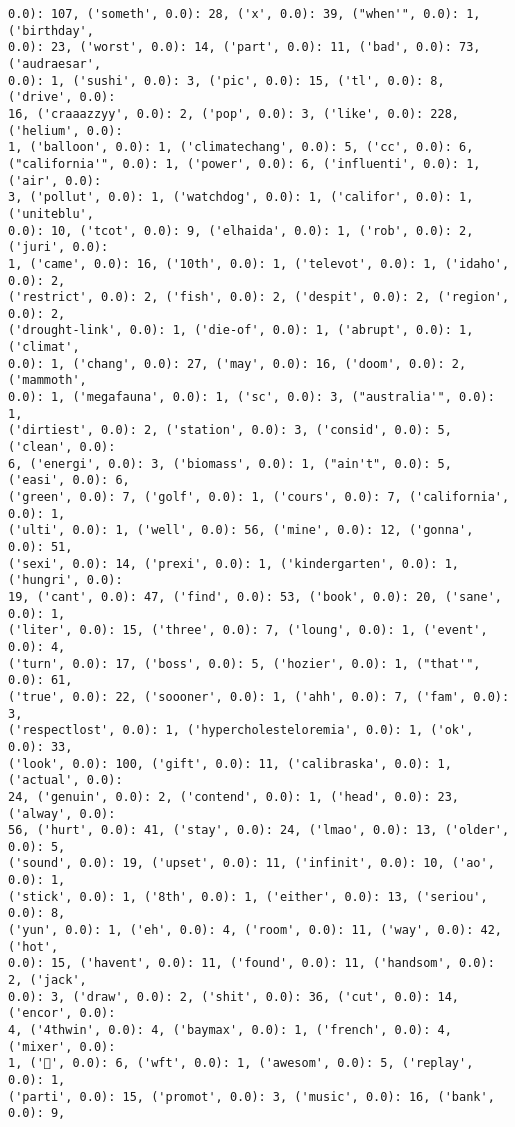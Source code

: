 \documentclass[11pt]{article}
\begin{document}
\begin{Verbatim}[commandchars=\\\{\}]
0.0): 107, ('someth', 0.0): 28, ('x', 0.0): 39, ("when'", 0.0): 1, ('birthday',
0.0): 23, ('worst', 0.0): 14, ('part', 0.0): 11, ('bad', 0.0): 73, ('audraesar',
0.0): 1, ('sushi', 0.0): 3, ('pic', 0.0): 15, ('tl', 0.0): 8, ('drive', 0.0):
16, ('craaazzyy', 0.0): 2, ('pop', 0.0): 3, ('like', 0.0): 228, ('helium', 0.0):
1, ('balloon', 0.0): 1, ('climatechang', 0.0): 5, ('cc', 0.0): 6,
("california'", 0.0): 1, ('power', 0.0): 6, ('influenti', 0.0): 1, ('air', 0.0):
3, ('pollut', 0.0): 1, ('watchdog', 0.0): 1, ('califor', 0.0): 1, ('uniteblu',
0.0): 10, ('tcot', 0.0): 9, ('elhaida', 0.0): 1, ('rob', 0.0): 2, ('juri', 0.0):
1, ('came', 0.0): 16, ('10th', 0.0): 1, ('televot', 0.0): 1, ('idaho', 0.0): 2,
('restrict', 0.0): 2, ('fish', 0.0): 2, ('despit', 0.0): 2, ('region', 0.0): 2,
('drought-link', 0.0): 1, ('die-of', 0.0): 1, ('abrupt', 0.0): 1, ('climat',
0.0): 1, ('chang', 0.0): 27, ('may', 0.0): 16, ('doom', 0.0): 2, ('mammoth',
0.0): 1, ('megafauna', 0.0): 1, ('sc', 0.0): 3, ("australia'", 0.0): 1,
('dirtiest', 0.0): 2, ('station', 0.0): 3, ('consid', 0.0): 5, ('clean', 0.0):
6, ('energi', 0.0): 3, ('biomass', 0.0): 1, ("ain't", 0.0): 5, ('easi', 0.0): 6,
('green', 0.0): 7, ('golf', 0.0): 1, ('cours', 0.0): 7, ('california', 0.0): 1,
('ulti', 0.0): 1, ('well', 0.0): 56, ('mine', 0.0): 12, ('gonna', 0.0): 51,
('sexi', 0.0): 14, ('prexi', 0.0): 1, ('kindergarten', 0.0): 1, ('hungri', 0.0):
19, ('cant', 0.0): 47, ('find', 0.0): 53, ('book', 0.0): 20, ('sane', 0.0): 1,
('liter', 0.0): 15, ('three', 0.0): 7, ('loung', 0.0): 1, ('event', 0.0): 4,
('turn', 0.0): 17, ('boss', 0.0): 5, ('hozier', 0.0): 1, ("that'", 0.0): 61,
('true', 0.0): 22, ('soooner', 0.0): 1, ('ahh', 0.0): 7, ('fam', 0.0): 3,
('respectlost', 0.0): 1, ('hypercholesteloremia', 0.0): 1, ('ok', 0.0): 33,
('look', 0.0): 100, ('gift', 0.0): 11, ('calibraska', 0.0): 1, ('actual', 0.0):
24, ('genuin', 0.0): 2, ('contend', 0.0): 1, ('head', 0.0): 23, ('alway', 0.0):
56, ('hurt', 0.0): 41, ('stay', 0.0): 24, ('lmao', 0.0): 13, ('older', 0.0): 5,
('sound', 0.0): 19, ('upset', 0.0): 11, ('infinit', 0.0): 10, ('ao', 0.0): 1,
('stick', 0.0): 1, ('8th', 0.0): 1, ('either', 0.0): 13, ('seriou', 0.0): 8,
('yun', 0.0): 1, ('eh', 0.0): 4, ('room', 0.0): 11, ('way', 0.0): 42, ('hot',
0.0): 15, ('havent', 0.0): 11, ('found', 0.0): 11, ('handsom', 0.0): 2, ('jack',
0.0): 3, ('draw', 0.0): 2, ('shit', 0.0): 36, ('cut', 0.0): 14, ('encor', 0.0):
4, ('4thwin', 0.0): 4, ('baymax', 0.0): 1, ('french', 0.0): 4, ('mixer', 0.0):
1, ('💜', 0.0): 6, ('wft', 0.0): 1, ('awesom', 0.0): 5, ('replay', 0.0): 1,
('parti', 0.0): 15, ('promot', 0.0): 3, ('music', 0.0): 16, ('bank', 0.0): 9,

\end{Verbatim}
\end{document}
